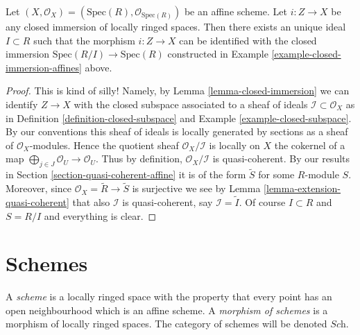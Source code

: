 \begin{lemma}
\label{lemma-closed-immersion-affine-case}
Let $(X, \mathcal{O}_X) = (\text{Spec}(R), \mathcal{O}_{\text{Spec}(R)})$
be an affine scheme. Let $i : Z \to X$ be any closed immersion
of locally ringed spaces. Then there exists an unique ideal
$I \subset R$ such that the morphism $i : Z \to X$ can be identified
with the closed immersion $\text{Spec}(R/I) \to \text{Spec}(R)$
constructed in Example \ref{example-closed-immersion-affines} above.
\end{lemma}

\begin{proof}
This is kind of silly! Namely, by Lemma \ref{lemma-closed-immersion}
we can identify $Z \to X$ with the closed subspace associated to
a sheaf of ideals $\mathcal{I} \subset \mathcal{O}_X$ as in
Definition \ref{definition-closed-subspace} and
Example \ref{example-closed-subspace}. 
By our conventions this sheaf of ideals is locally generated
by sections as a sheaf of $\mathcal{O}_X$-modules.
Hence the quotient sheaf $\mathcal{O}_X / \mathcal{I}$
is locally on $X$ the cokernel
of a map $\bigoplus_{j \in J} \mathcal{O}_U \to \mathcal{O}_U$.
Thus by definition, $\mathcal{O}_X / \mathcal{I}$ is quasi-coherent.
By our results in Section \ref{section-quasi-coherent-affine}
it is of the form $\widetilde S$ for some $R$-module $S$.
Moreover, since $\mathcal{O}_X = \widetilde R \to \widetilde S$
is surjective we see by Lemma \ref{lemma-extension-quasi-coherent}
that also $\mathcal{I}$ is quasi-coherent, say $\mathcal{I} = \widetilde I$.
Of course $I \subset R$ and $S = R/I$ and everything is clear.
\end{proof}













\section{Schemes}
\label{section-schemes}

\begin{definition}
\label{definition-scheme}
A {\it scheme} is a locally ringed space with the property that
every point has an open neighbourhood which is an affine scheme.
A {\it morphism of schemes} is a morphism of locally
ringed spaces. The category of schemes will be denoted
$\textit{Sch}$.
\end{definition}

